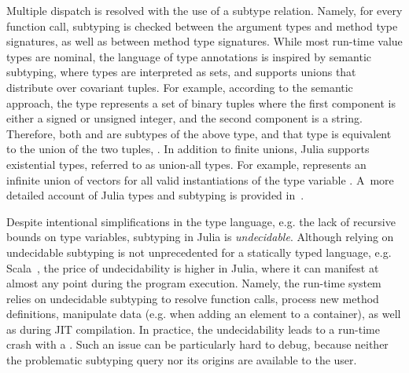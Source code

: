 
Multiple dispatch is resolved with the use of a subtype relation.
Namely, for every function call, subtyping is checked between
the argument types and method type signatures,
as well as between method type signatures.
While most run-time value types are nominal, %
the language of type annotations is inspired by semantic subtyping,
where types are interpreted as sets,
and supports unions that distribute over covariant tuples.
For example, according to the semantic approach, the type 
 represents a set of binary
tuples where the first component is either a signed or unsigned integer,
and the second component is a string. Therefore, both
 and  are subtypes
of the above type, and that type is equivalent to the union of the two
tuples, .
In addition to finite unions, Julia supports existential types, referred to as
union-all types. For example, 
represents an infinite union of vectors  for all valid
instantiations  of the type variable .
A~more detailed account of Julia types and subtyping
is provided in~.

Despite intentional simplifications in the type language,
e.g. the lack of recursive bounds on type variables,
subtyping in Julia is \emph{undecidable}. %
Although relying on undecidable subtyping is not unprecedented
for a statically typed language, e.g. Scala~\cite{hu:dot-undec:2020},
the price of undecidability
is higher in Julia, where it
can manifest at almost any point during the program execution.
Namely, the run-time system relies on undecidable subtyping
to resolve function calls,
process new method definitions,
manipulate data (e.g. when adding an element to a container),
as well as during JIT compilation.
In practice, the undecidability
leads to a run-time crash with a .
Such an issue can be particularly hard to debug,
because neither the problematic subtyping query nor its origins are available
to the user.


